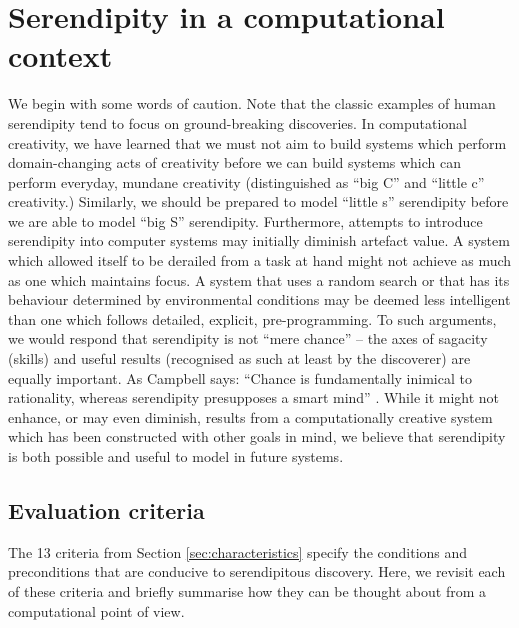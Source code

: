 \section{Serendipity in a computational context} \label{sec:computational-serendipity}

We begin with some words of caution.
%
Note that the classic examples of human serendipity tend to focus on
ground-breaking discoveries.  In computational creativity, we have
learned that we must not aim to build systems which perform
domain-changing acts of creativity before we can build systems which
can perform everyday, mundane creativity (distinguished as ``big C''
and ``little c'' creativity.)  Similarly, we should be prepared to
model ``little s'' serendipity before we are able to model ``big S''
serendipity.  Furthermore, attempts to introduce serendipity into
computer systems may initially diminish artefact value.
%
A system which allowed itself to be derailed from a task at hand might
not achieve as much as one which maintains focus.  A system that uses
a random search or that has its behaviour determined by environmental
conditions may be deemed less intelligent than one which follows
detailed, explicit, pre-programming.
%
To such arguments, we would respond that serendipity is not ``mere
chance'' -- the axes of sagacity (skills) and useful results
(recognised as such at least by the discoverer) are equally important.
As Campbell says: ``Chance is fundamentally inimical to rationality,
whereas serendipity presupposes a smart mind'' \cite{campbell}. While
it might not enhance, or may even diminish, results from a
computationally creative system which has been constructed with other
goals in mind, we believe that serendipity is both possible and useful
to model in future systems.

\subsection{Evaluation criteria} \label{sec:evaluation-criteria}

The 13 criteria from Section \ref{sec:characteristics}
specify the conditions and preconditions that are conducive to
serendipitous discovery.  Here, we revisit each of these criteria and
briefly summarise how they can be thought about from a computational
point of view.


